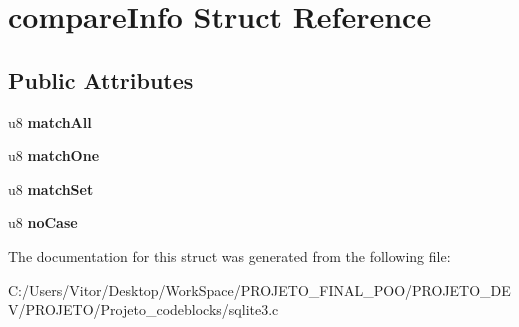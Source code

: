 \hypertarget{structcompare_info}{\section{compare\-Info Struct Reference}
\label{structcompare_info}
}
\subsection*{Public Attributes}
\begin{DoxyCompactItemize}
\item 
\hypertarget{structcompare_info_a1161e850029ef556e6daee856d32b2e2}{u8 {\bfseries match\-All}}\label{structcompare_info_a1161e850029ef556e6daee856d32b2e2}

\item 
\hypertarget{structcompare_info_ab9aabbf6d3df26bad786b532330a2fd7}{u8 {\bfseries match\-One}}\label{structcompare_info_ab9aabbf6d3df26bad786b532330a2fd7}

\item 
\hypertarget{structcompare_info_a5d2ff58a72c9eb7d22f18915c1751655}{u8 {\bfseries match\-Set}}\label{structcompare_info_a5d2ff58a72c9eb7d22f18915c1751655}

\item 
\hypertarget{structcompare_info_a6de76861b066547321f7a255cb7042ab}{u8 {\bfseries no\-Case}}\label{structcompare_info_a6de76861b066547321f7a255cb7042ab}

\end{DoxyCompactItemize}


The documentation for this struct was generated from the following file\-:\begin{DoxyCompactItemize}
\item 
C\-:/\-Users/\-Vitor/\-Desktop/\-Work\-Space/\-P\-R\-O\-J\-E\-T\-O\-\_\-\-F\-I\-N\-A\-L\-\_\-\-P\-O\-O/\-P\-R\-O\-J\-E\-T\-O\-\_\-\-D\-E\-V/\-P\-R\-O\-J\-E\-T\-O/\-Projeto\-\_\-codeblocks/sqlite3.\-c\end{DoxyCompactItemize}
